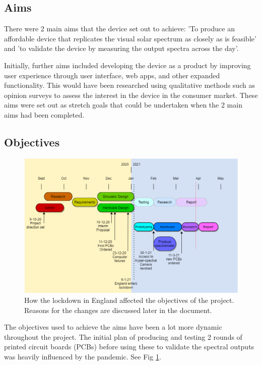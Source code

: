 \subsection{Aims}

There were 2 main aims that the device set out to achieve: 'To produce an affordable device that replicates the visual solar spectrum as closely as is feasible' and 'to validate the device by measuring the output spectra across the day'.

Initially, further aims included developing the device as a product by improving user experience through user interface, web apps, and other expanded functionality. This would have been researched using qualitative methods such as opinion surveys to assess the interest in the device in the consumer market. These aims were set out as stretch goals that could be undertaken when the 2 main aims had been completed.

\subsection{Objectives}

\begin{figure}[bt]
\includegraphics[width=\textwidth]{Images/plan}
\caption{How the lockdown in England affected the objectives of the project. Reasons for the changes are discussed later in the document.}
\label{Objectives}
\end{figure}

The objectives used to achieve the aims have been a lot more dynamic throughout the project. The initial plan of producing and testing 2 rounds of printed circuit boards (PCBs) before using these to validate the spectral outputs was heavily influenced by the pandemic. See Fig \ref{Objectives}.

